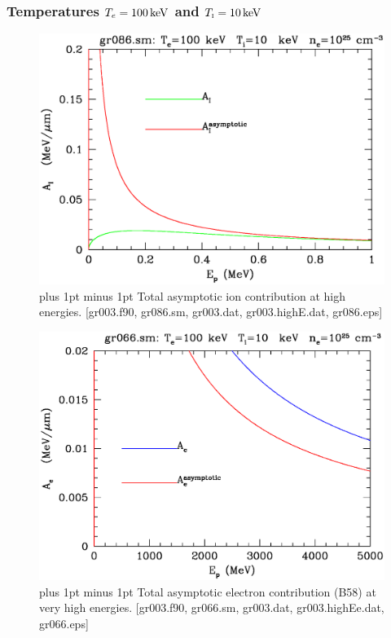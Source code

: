 \documentclass[preprint,12pt,eqsecnum,nofootinbib,amsmath,amssymb]{revtex4}
\newcommand{\smI}{{\rm\scriptscriptstyle I}}
\newcommand{\footnoteskip}{\baselineskip 12pt plus 1pt minus 1pt}
\begin{document}
\pagebreak
\subsubsection{Temperatures $T_e=100\,{\rm keV}$ and $T_\smI=10\,{\rm keV}$}

\vskip-2cm 
\begin{figure}[h!]
\includegraphics[scale=0.45]{gr086.eps} 
\vskip-0.8cm 
\caption{\footnoteskip  
  Total asymptotic ion contribution at high energies. [gr003.f90,
  gr086.sm, gr003.dat, gr003.highE.dat, gr086.eps]
}
\label{fig:gr086}
\end{figure}

\vskip-2cm 
\begin{figure}[h!]
\includegraphics[scale=0.45]{gr066.eps}
\vskip-0.8cm 
\caption{\footnoteskip  
  Total asymptotic electron contribution (B58) at very high
  energies. [gr003.f90, gr066.sm, gr003.dat, gr003.highEe.dat, gr066.eps]
}
\label{fig:gr066}
\end{figure}
\end{document}
